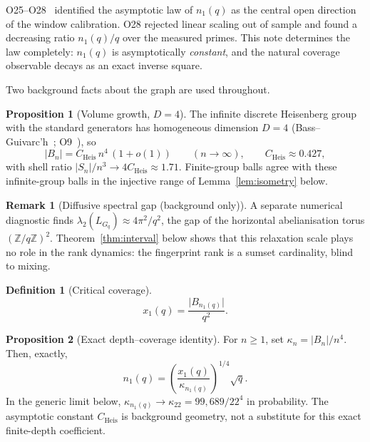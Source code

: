 \documentclass[11pt,a4paper]{article}
\theoremstyle{plain}
\theoremstyle{definition}
\newtheorem{definition}{Definition}
\newtheorem{proposition}{Proposition}
\newtheorem{remark}{Remark}
\newcommand{\Cheis}{C_{\mathrm{Heis}}}
\newcommand{\xone}{x_1}
\newcommand{\none}{n_1}
\begin{document}
    O25--O28~\cite{Beau2026a29,Beau2026a32} identified the asymptotic law of $\none(q)$ as the
    central open direction of the window calibration.
    O28 rejected linear scaling out of sample and found a decreasing ratio $\none(q)/q$ over the
    measured primes.
    This note determines the law completely: $\none(q)$ is asymptotically \emph{constant}, and the
    natural coverage observable decays as an exact inverse square.

    Two background facts about the graph are used throughout.

    \begin{proposition}[Volume growth, $D=4$]
      \label{prop:growth}
      The infinite discrete Heisenberg group with the standard generators has homogeneous dimension
      $D = 4$ (Bass--Guivarc'h~\cite{Bass1972,Guivarch1973}; O9~\cite{Beau2026a13}), so
      \begin{equation}
        \lvert B_n\rvert = \Cheis\,n^4\,(1 + o(1))
        \qquad (n\to\infty),
        \qquad \Cheis \approx 0.427,
        \label{eq:growth}
      \end{equation}
      with shell ratio $\lvert S_n\rvert / n^3 \to 4\Cheis \approx 1.71$.
      Finite-group balls agree with these infinite-group balls in the injective range of
      Lemma~\ref{lem:isometry} below.
    \end{proposition}

    \begin{remark}[Diffusive spectral gap (background only)]
      \label{prop:gap}
      A separate numerical diagnostic finds
      $\lambda_2(L_{G_q}) \approx 4\pi^2/q^2$, the gap of the horizontal abelianisation torus
      $(\mathbb{Z}/q\mathbb{Z})^2$.
      Theorem~\ref{thm:interval} below shows that this relaxation scale plays no role in the rank
      dynamics: the fingerprint rank is a sumset cardinality, blind to mixing.
    \end{remark}

    \begin{definition}[Critical coverage]
      \label{def:x1}
      \begin{equation}
        \xone(q) = \frac{\lvert B_{\none(q)}\rvert}{q^2}.
        \label{eq:x1}
      \end{equation}
    \end{definition}

    \begin{proposition}[Exact depth--coverage identity]
      \label{prop:reduction}
      For $n\ge1$, set $\kappa_n=\lvert B_n\rvert/n^4$.
      Then, exactly,
      \begin{equation}
        \none(q) = \left(\frac{\xone(q)}{\kappa_{\none(q)}}\right)^{1/4}\sqrt{q}.
        \label{eq:reduction}
      \end{equation}
      In the generic limit below, $\kappa_{\none(q)}\to\kappa_{22}=99{,}689/22^4$ in probability.
      The asymptotic constant $\Cheis$ is background geometry, not a substitute for this exact
      finite-depth coefficient.
    \end{proposition}
\end{document}
